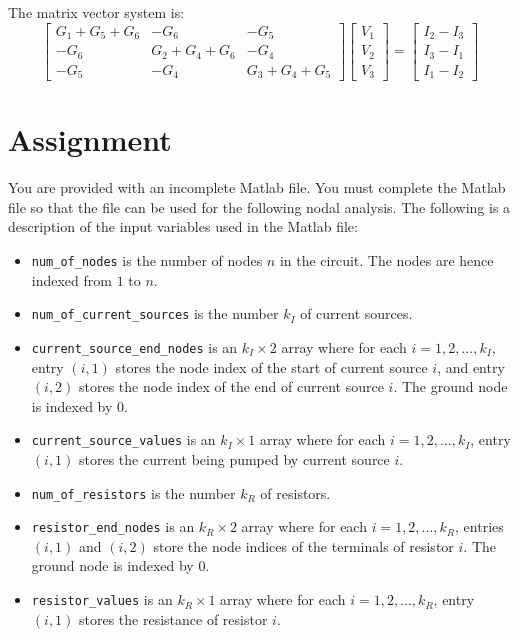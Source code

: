 \documentclass{article}
\begin{document}
The matrix vector system is:        
\[\begin{bmatrix} 
G_1 + G_5 + G_6 & -G_6 & -G_5 \\ 
-G_6 & G_2 + G_4 + G_6 & -G_4 \\ 
-G_5 & -G_4 & G_3 + G_4 + G_5 
\end{bmatrix}
\begin{bmatrix} V_1 \\ V_2 \\ V_3 \end{bmatrix} = 
\begin{bmatrix} I_2 - I_3 \\ I_3 - I_1 \\ I_1 - I_2 \end{bmatrix}\]




\section{Assignment}

You are provided with an incomplete Matlab file. You must complete the Matlab file so that the file can be used for the following nodal analysis. The following is a description of the input variables used in the Matlab file:

\begin{itemize}
\item \texttt{num\_of\_nodes} is the number of nodes \(n\) in the circuit. The nodes are hence indexed from \(1\) to \(n\).
\item \texttt{num\_of\_current\_sources} is the number \(k_I\) of current sources.  
\item \texttt{current\_source\_end\_nodes} is an \(k_I \times 2\) array where for each \(i = 1, 2, ..., k_I\), entry \((i, 1)\) stores the node index of the start of current source \(i\), and entry \((i, 2)\) stores the node index of the end of current source \(i\). The ground node is indexed by \(0\).   
\item \texttt{current\_source\_values} is an \(k_I \times 1\) array where for each \(i = 1, 2, ..., k_I\), entry \((i, 1)\) stores the current being pumped by current source \(i\).    
\item \texttt{num\_of\_resistors} is the number \(k_R\) of resistors.  
\item \texttt{resistor\_end\_nodes} is an \(k_R \times 2\) array where for each \(i = 1, 2, ..., k_R\), entries \((i, 1)\) and \((i, 2)\) store the node indices of the terminals of resistor \(i\). The ground node is indexed by \(0\).    
\item \texttt{resistor\_values} is an \(k_R \times 1\) array where for each \(i = 1, 2, ..., k_R\), entry \((i, 1)\) stores the resistance of resistor \(i\).  
\end{itemize} 
\end{document}
